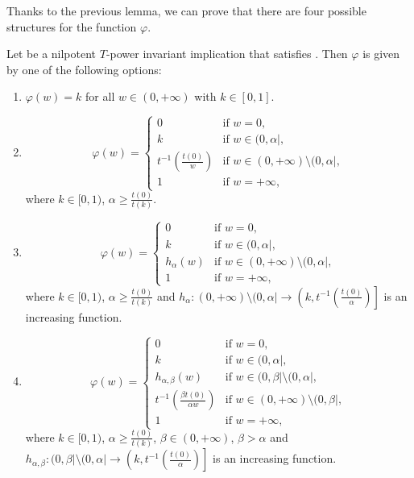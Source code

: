 Thanks to the previous lemma, we can prove that there are four possible structures for the function $\varphi$.
\pagebreak
\begin{lemma}\label{lemma:nilpotent:(EP)varphi}
	Let \IT be a nilpotent $T$-power invariant implication that satisfies \EP. Then $\varphi$ is given by one of the following options:
	\begin{enumerate}[label=(\roman*)]
		\item $\varphi(w)=k$ for all $w \in (0,+\infty)$ with $k \in [0,1]$.
		\item
		$$
		\varphi(w)
		=
		\left\{ \begin{array}{ll}
			0 &   \text{if }   w=0, \\
			k &   \text{if }   w \in (0,\alpha|, \\
			t^{-1}\left(\frac{t(0)}{w}\right) &  \text{if }  w \in (0,+\infty) \setminus (0,\alpha|, \\
			1 & \text{if } w=+\infty,
		\end{array}
		\right.
		$$
		where $k \in [0,1)$, $\alpha \geq \frac{t(0)}{t(k)}$.
		\item
		$$
		\varphi(w)
		=
		\left\{ \begin{array}{ll}
			0 &   \text{if }   w=0, \\
			k &   \text{if }   w \in (0,\alpha|, \\
			h_{\alpha}(w) &  \text{if }  w \in (0,+\infty) \setminus (0,\alpha|, \\
			1 & \text{if } w=+\infty,
		\end{array}
		\right.
		$$
		where $k \in [0,1)$, $\alpha \geq \frac{t(0)}{t(k)}$ and $h_{\alpha}:(0,+\infty) \setminus (0,\alpha| \to \left ( k, t^{-1}\left(\frac{t(0)}{\alpha}\right)\right ]$ is an increasing function.
		\item
		$$
		\varphi(w)
		=
		\left\{ \begin{array}{ll}
			0 &   \text{if }   w=0, \\
			k &   \text{if }   w \in (0,\alpha|, \\
			h_{\alpha,\beta}(w) &  \text{if }  w \in (0,\beta| \setminus (0,\alpha|, \\
			t^{-1}\left(\frac{\beta t(0)}{\alpha w}\right) &  \text{if }  w \in (0,+\infty) \setminus (0,\beta|, \\
			1 & \text{if } w=+\infty,
		\end{array}
		\right.
		$$
		where $k \in [0,1)$, $\alpha \geq \frac{t(0)}{t(k)}$, $\beta \in (0,+\infty)$, $\beta > \alpha$  and $h_{\alpha,\beta}:(0,\beta| \setminus (0,\alpha| \to \left ( k, t^{-1}\left(\frac{t(0)}{\alpha}\right)\right ]$ is an increasing function.
	\end{enumerate}
\end{lemma}
